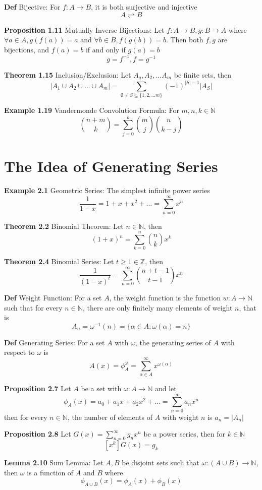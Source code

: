 \documentclass[11pt,notitlepage]{report}
\newcommand{\bb}[1]{\ensuremath{\mathbb{#1}}}
\begin{document}
\textbf{Def} Bijective: For $f: A \to B$, it is both surjective and injective
$$A	\rightleftharpoons B$$

\textbf{Proposition 1.11} Mutually Inverse Bijections: Let $f: A \to B, g: B \to A$ where $\forall a \in A, g(f(a)) = a$ and $\forall b \in B, f(g(b)) = b$. Then both $f, g$ are bijections, and $f(a) = b$ if and only if $g(a) = b$
$$g = f^{-1}, f = g^{-1}$$

\textbf{Theorem 1.15} Inclusion/Exclusion: Let $A_q, A_2, \dots A_m$ be finite sets, then
$$|A_1 \cup A_2 \cup \dots \cup A_m| = \sum_{\emptyset \ne S \subseteq \{1, 2, \dots m\}} (-1)^{|S|-1}|A_S|$$

\textbf{Example 1.19} Vandermonde Convolution Formula: For $m, n, k \in \bb N$
$$\binom{n+m}{k} = \sum_{j=0}^k \binom{m}{j}\binom{n}{k-j}$$

\newpage
\section{The Idea of Generating Series}

\textbf{Example 2.1} Geometric Series: The simplest infinite power series
$$\frac{1}{1-x} = 1 + x + x^2 + \dots = \sum_{n=0}^{\infty} x^n$$

\textbf{Theorem 2.2} Binomial Theorem: Let $n \in \bb N$, then
$$(1+x)^n = \sum_{k=0}^n \binom{n}{k}x^k$$

\textbf{Theorem 2.4} Binomial Series: Let $t \geq 1 \in \bb Z$, then
$$\frac{1}{(1-x)^t} = \sum_{n=0}^\infty \binom{n+t-1}{t-1}x^n$$

\textbf{Def} Weight Function: For a set $A$, the weight function is the function $w: A \to \bb N$ such that for every $n \in \bb N$, there are only finitely many elements of weight $n$, that is
$$A_n = \omega^{-1}(n) = \{\alpha \in A: \omega(\alpha) = n\}$$

\textbf{Def} Generating Series: For a set $A$ with $\omega$, the generating series of $A$ with respect to $\omega$ is
$$A(x) = \phi_A^\omega = \sum_{\alpha \in A}^\infty x^{\omega(\alpha)}$$

\textbf{Proposition 2.7} Let $A$ be a set with $\omega: A \to \bb N$ and let 
$$\phi_A(x) = a_0 + a_1x + a_2x^2 + \dots = \sum_{n=0}^\infty a_nx^n$$
then for every $n \in \bb N$, the number of elements of $A$ with weight $n$ is $a_n = |A_n|$

\textbf{Proposition 2.8} Let $G(x) = \sum_{n=0}^\infty g_nx^n$ be a power series, then for $k \in \bb N$
$$[x^k]G(x) = g_k$$

\textbf{Lemma 2.10} Sum Lemma: Let $A, B$ be disjoint sets such that $\omega: (A \cup B) \to \bb N$, then $\omega$ is a function of $A$ and $B$ where
$$\phi_{A \cup B}(x) = \phi_A(x) + \phi_B(x)$$
\end{document}
